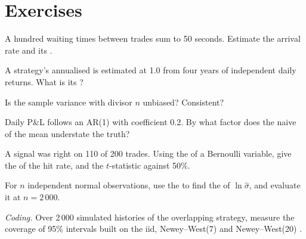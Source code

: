 \section{Exercises}

\begin{exercise}[$\star$]\label{exo:qm:estimation:1}
A hundred waiting times between trades sum to 50 seconds. Estimate the arrival rate and its .
\end{exercise}

\begin{exercise}[$\star$]\label{exo:qm:estimation:2}
A strategy's annualised  is estimated at 1.0 from four years of independent daily returns. What is its ?
\end{exercise}

\begin{exercise}[$\star$]\label{exo:qm:estimation:3}
Is the sample variance with divisor $n$ unbiased? Consistent?
\end{exercise}

\begin{exercise}[$\star\star$]\label{exo:qm:estimation:4}
Daily P\&L follows an AR(1) with coefficient 0.2. By what factor does the naive  of the mean understate the
truth?
\end{exercise}

\begin{exercise}[$\star\star$]\label{exo:qm:estimation:5}
A signal was right on 110 of 200 trades. Using the  of a Bernoulli variable, give the  of the hit
rate, and the $t$-statistic against 50\%.
\end{exercise}

\begin{exercise}[$\star\star$]\label{exo:qm:estimation:6}
For $n$ independent normal observations, use the  to find the  of $\ln\hat\sigma$, and evaluate it at $n = 2\,000$.
\end{exercise}

\begin{exercise}[$\star\star\star$]\label{exo:qm:estimation:7}
\emph{Coding.} Over 2\,000 simulated histories of the overlapping strategy, measure the coverage of 95\% intervals built on the
iid, Newey--West(7) and Newey--West(20) .
\end{exercise}

